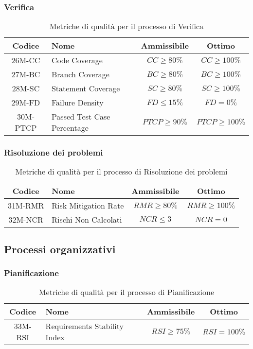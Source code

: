 \subsubsection{Verifica}
\begin{table}[h!]
	\centering
	\begin{tabular}{ | c | l | c | c | }
		\hline
		Codice   & Nome                        & Ammissibile      & Ottimo            \\
		\hline
		26M-CC   & Code Coverage               & $CC \geq 80\%$   & $CC \geq 100\%$   \\
		27M-BC   & Branch Coverage             & $BC \geq 80\%$   & $BC \geq 100\%$   \\
		28M-SC   & Statement Coverage          & $SC \geq 80\%$   & $SC \geq 100\%$   \\
		29M-FD   & Failure Density             & $FD \leq 15\%$   & $FD = 0\%$        \\
		30M-PTCP & Passed Test Case Percentage & $PTCP \geq 90\%$ & $PTCP \geq 100\%$ \\
		\hline
	\end{tabular}
	\caption{Metriche di qualità per il processo di Verifica}
\end{table}

\newpage
\subsubsection{Risoluzione dei problemi}
\begin{table}[h!]
	\centering
	\begin{tabular}{ | c | l | c | c | }
		\hline
		Codice   & Nome                 & Ammissibile     & Ottimo           \\
		\hline
		31M-RMR  & Risk Mitigation Rate	& $RMR \geq 80\%$ & $RMR \geq 100\%$ \\
		32M-NCR  & Rischi Non Calcolati	& $NCR \leq 3$    & $NCR = 0$        \\
		\hline
	\end{tabular}
	\caption{Metriche di qualità per il processo di Risoluzione dei problemi}
\end{table}

\subsection{Processi organizzativi}
\subsubsection{Pianificazione}
\begin{table}[h!]
	\centering
	\begin{tabular}{ | c | l | c | c | }
		\hline
		Codice   & Nome                         & Ammissibile    & Ottimo       \\
		\hline
		33M-RSI  & Requirements Stability Index & $RSI \geq 75\%$ & $RSI = 100\%$ \\
		\hline
	\end{tabular}
	\caption{Metriche di qualità per il processo di Pianificazione}
\end{table}
